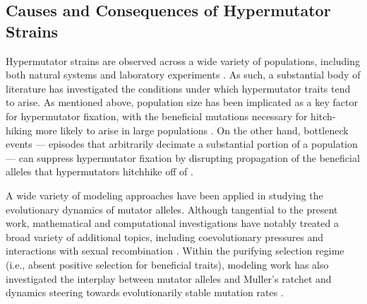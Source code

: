 \subsection{Causes and Consequences of Hypermutator Strains}

Hypermutator strains are observed across a wide variety of populations, including both natural systems and laboratory experiments \citep{sniegowski1997evolution,swings2017adaptive,maddamsetti2020divergent,cherry2018methylation,notleymcrobb2002enrichment,shaver2002fitness,voordeckers2015adaptation,leclerc1996high}.
As such, a substantial body of literature has investigated the conditions under which hypermutator traits tend to arise.
As mentioned above, population size has been implicated as a key factor for hypermutator fixation, with the beneficial mutations necessary for hitch-hiking more likely to arise in large populations \citep{chao1983competition}.
On the other hand, bottleneck events --- episodes that arbitrarily decimate a substantial portion of a population --- can suppress hypermutator fixation by disrupting propagation of the beneficial alleles that hypermutators hitchhike off of \citep{raynes2013effect}.

A wide variety of modeling approaches have been applied in studying the evolutionary dynamics of mutator alleles.
Although tangential to the present work, mathematical and computational investigations have notably treated a broad variety of additional topics, including coevolutionary pressures \citep{pal2007coevolution} and interactions with sexual recombination \citep{johnson1999beneficial}.
Within the purifying selection regime (i.e., absent positive selection for beneficial traits), modeling work has also investigated the interplay between mutator alleles and Muller's ratchet \citep{soderberg2011kickstarting} and dynamics steering towards evolutionarily stable mutation rates \citep{lynch2008cellular}.

